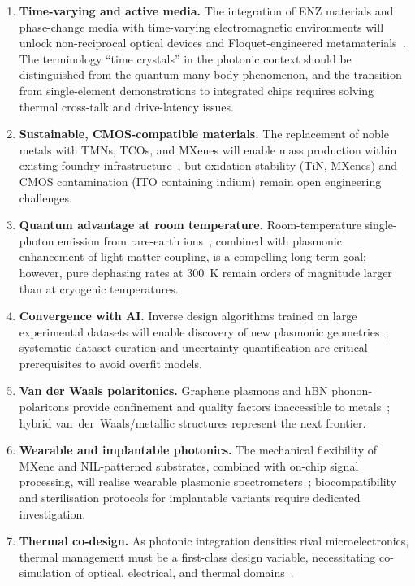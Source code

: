 \documentclass[twocolumn,10pt]{article}
\begin{document}
\begin{enumerate}[leftmargin=*,itemsep=2pt]
  \item \textbf{Time-varying and active media.}  The integration of ENZ
    materials and phase-change media with time-varying electromagnetic
    environments will unlock non-reciprocal optical devices and
    Floquet-engineered metamaterials~\cite{engheta2013pursuing,liberal2017near,shaltout2019spatiotemporal}.
    The terminology ``time crystals'' in the photonic context should be
    distinguished from the quantum many-body phenomenon, and the
    transition from single-element demonstrations to integrated chips
    requires solving thermal cross-talk and drive-latency issues.

  \item \textbf{Sustainable, CMOS-compatible materials.}  The replacement
    of noble metals with TMNs, TCOs, and MXenes will enable mass
    production within existing foundry infrastructure~\cite{guler2015refractory,naik2013alternative},
    but oxidation stability (TiN, MXenes) and CMOS contamination
    (ITO containing indium) remain open engineering challenges.

  \item \textbf{Quantum advantage at room temperature.}  Room-temperature
    single-photon emission from rare-earth ions~\cite{dibos2018atomic},
    combined with plasmonic enhancement of light-matter coupling, is a
    compelling long-term goal; however, pure dephasing rates at 300~K
    remain orders of magnitude larger than at cryogenic temperatures.

  \item \textbf{Convergence with AI.}  Inverse design algorithms trained
    on large experimental datasets will enable discovery of new plasmonic
    geometries~\cite{malkiel2018plasmonic}; systematic dataset curation
    and uncertainty quantification are critical prerequisites to avoid
    overfit models.

  \item \textbf{Van der Waals polaritonics.}  Graphene plasmons and hBN
    phonon-polaritons provide confinement and quality factors
    inaccessible to metals~\cite{grigorenko2012graphene,caldwell2014sub};
    hybrid van~der~Waals/metallic structures represent the next frontier.

  \item \textbf{Wearable and implantable photonics.}  The mechanical
    flexibility of MXene and NIL-patterned substrates, combined with
    on-chip signal processing, will realise wearable plasmonic
    spectrometers~\cite{kim2019wearable,gogotsi2019rise}; biocompatibility
    and sterilisation protocols for implantable variants require
    dedicated investigation.

  \item \textbf{Thermal co-design.}  As photonic integration densities
    rival microelectronics, thermal management must be a
    first-class design variable, necessitating co-simulation of optical,
    electrical, and thermal domains~\cite{garimella2008thermal,tian2018unusual}.
\end{enumerate}
\end{document}
